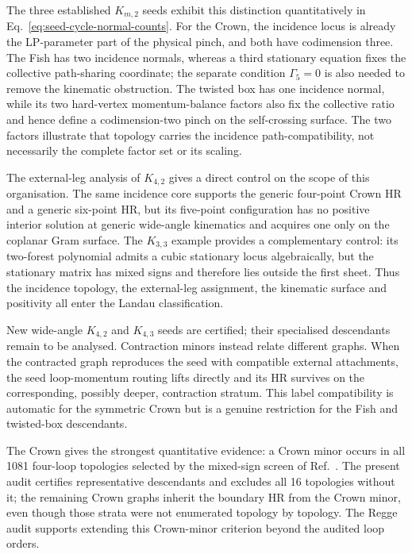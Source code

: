 \documentclass[a4paper,11pt]{article}
\begin{document}
The three established \(K_{m,2}\) seeds exhibit this distinction
quantitatively in Eq.~\eqref{eq:seed-cycle-normal-counts}.  For the Crown,
the incidence locus is already the LP-parameter part of the physical pinch,
and both have codimension three.  The Fish has two incidence normals, whereas
a third stationary equation fixes the collective path-sharing coordinate;
the separate condition \(\Gamma_5=0\) is also needed to remove the kinematic
obstruction.  The twisted box has one incidence normal, while its two
hard-vertex momentum-balance factors also fix the collective ratio and hence
define a codimension-two pinch on the self-crossing surface.  The two factors
illustrate that topology carries the incidence path-compatibility, not
necessarily the complete factor set or its scaling.

The external-leg analysis of \(K_{4,2}\) gives a direct control on the scope
of this organisation.  The same incidence core supports the generic
four-point Crown HR and a generic six-point HR, but its five-point
configuration has no positive interior solution at generic wide-angle
kinematics and acquires one only on the coplanar Gram surface.  The
\(K_{3,3}\) example provides a complementary control: its two-forest
polynomial admits a cubic stationary locus algebraically, but the stationary
matrix has mixed signs and therefore lies outside the first sheet.  Thus the
incidence topology, the external-leg assignment, the kinematic surface and
positivity all enter the Landau classification.

New wide-angle \(K_{4,2}\) and \(K_{4,3}\) seeds are certified; their
specialised descendants remain to be analysed.  Contraction minors instead
relate different graphs.  When the contracted graph reproduces the seed with
compatible external attachments, the seed loop-momentum routing lifts directly
and its HR survives on the corresponding, possibly deeper, contraction
stratum.  This label compatibility is automatic for the symmetric Crown but is
a genuine restriction for the Fish and twisted-box descendants.

The Crown gives the strongest quantitative evidence: a Crown minor occurs in
all 1081 four-loop topologies selected by the mixed-sign screen
of Ref.~\cite{Gardi:2024axt}.  The present audit certifies representative
descendants and excludes all 16 topologies without it; the remaining Crown
graphs inherit the boundary HR from the Crown minor, even though those
strata were not enumerated topology by topology.  The Regge audit supports
extending this Crown-minor criterion beyond the audited loop orders.
\end{document}
